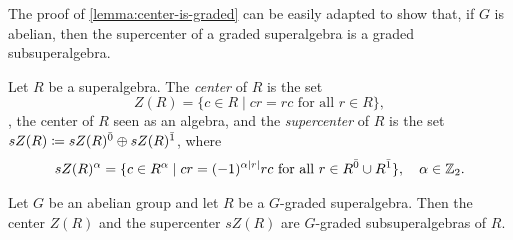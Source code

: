 The proof of \cref{lemma:center-is-graded} can be easily adapted to show that, if $G$ is abelian, then the supercenter of a graded superalgebra is a graded subsuperalgebra. 


\begin{defi}
	Let $R$ be a superalgebra.
	The \emph{center} of $R$ is the set
	\[
		Z(R) = \{c\in R \mid cr = rc \text{ for all } r\in R \},
	\]
	\ie, the center of $R$ seen as an algebra, and the \emph{supercenter} of $R$ is the set $sZ(R) \coloneqq sZ(R)^{\bar0} \oplus sZ(R)^{\bar1}$, where
	\begin{align*}
		sZ(R)^\alpha = \{c\in R^\alpha \mid cr = (-1)^{\alpha |r|} rc \text{ for all } r\in R^{\bar0}\cup R^{\bar1} \},\quad \alpha \in \mathbb{Z}_2.
	\end{align*}
\end{defi}





\begin{lemma}%
	Let $G$ be an abelian group and let $R$ be a $G$-graded superalgebra.
	Then the center $Z(R)$ and the supercenter $sZ(R)$ are $G$-graded subsuperalgebras of $R$.
\end{lemma}

